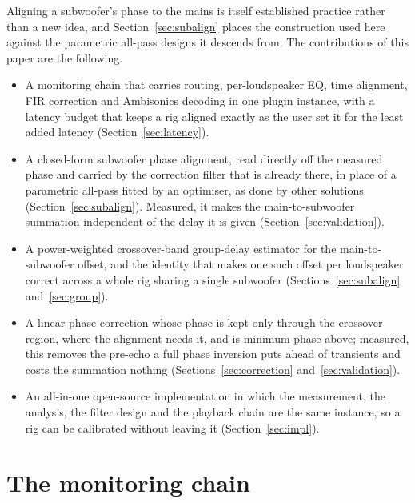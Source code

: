 \documentclass[10pt,a4paper]{article}
\begin{document}
Aligning a subwoofer's phase to the mains is itself established practice rather than a new idea, and Section~\ref{sec:subalign} places the construction used here against the parametric all-pass designs it descends from. The contributions of this paper are the following.

\begin{itemize}
  \item A monitoring chain that carries routing, per-loudspeaker EQ, time alignment, FIR correction and Ambisonics decoding in one plugin instance, with a latency budget that keeps a rig aligned exactly as the user set it for the least added latency (Section~\ref{sec:latency}).
  \item A closed-form subwoofer phase alignment, read directly off the measured phase and carried by the correction filter that is already there, in place of a parametric all-pass fitted by an optimiser, as done by other solutions (Section~\ref{sec:subalign}). Measured, it makes the main-to-subwoofer summation independent of the delay it is given (Section~\ref{sec:validation}).
  \item A power-weighted crossover-band group-delay estimator for the main-to-subwoofer offset, and the identity that makes one such offset per loudspeaker correct across a whole rig sharing a single subwoofer (Sections~\ref{sec:subalign} and~\ref{sec:group}).
  \item A linear-phase correction whose phase is kept only through the crossover region, where the alignment needs it, and is minimum-phase above; measured, this removes the pre-echo a full phase inversion puts ahead of transients and costs the summation nothing (Sections~\ref{sec:correction} and~\ref{sec:validation}).
  \item An all-in-one open-source implementation in which the measurement, the analysis, the filter design and the playback chain are the same instance, so a rig can be calibrated without leaving it (Section~\ref{sec:impl}).
\end{itemize}

\section{The monitoring chain}\label{sec:chain}
\end{document}
